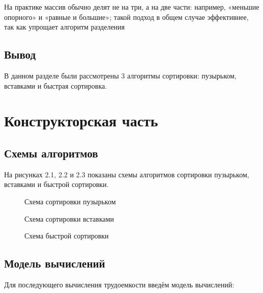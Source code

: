 \documentclass[12pt]{report}
\begin{document}
На практике массив обычно делят не на три, а на две части: например, «меньшие опорного» и «равные и большие»; такой подход в общем случае эффективнее, так как упрощает алгоритм разделения 

\section{Вывод}

В данном разделе были рассмотрены 3 алгоритмы сортировки: пузырьком, вставками и быстрая сортировка.
	
\clearpage

\chapter{Конструкторская часть}

\section{Схемы алгоритмов}

На рисунках 2.1, 2.2 и 2.3 показаны схемы алгоритмов сортировки пузырьком, вставками и быстрой сортировки.

\begin{figure}[h]
	\centering
	\caption{Схема сортировки пузырьком}
	\label{fig:mpr}
\end{figure}

\begin{figure}[h]
	\centering
	\caption{Схема сортировки вставками}
	\label{fig:mpr}
\end{figure}

\begin{figure}[h]
	\centering
	\caption{Схема быстрой сортировки}
	\label{fig:mpr}
\end{figure}


\section{Модель вычислений}

Для последующего вычисления трудоемкости введём модель вычислений:
\end{document}
